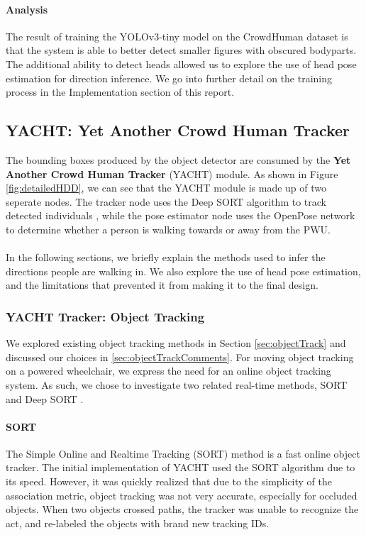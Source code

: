 \paragraph{Analysis}
The result of training the YOLOv3-tiny model on the CrowdHuman dataset is that the system is able to better detect smaller figures with obscured bodyparts. The additional ability to detect heads allowed us to explore the use of head pose estimation for direction inference. We go into further detail on the training process in the Implementation section of this report.

\subsection{YACHT: Yet Another Crowd Human Tracker}
The bounding boxes produced by the object detector are consumed by the \textbf{Yet Another Crowd Human Tracker} (YACHT) module. As shown in Figure \ref{fig:detailedHDD}, we can see that the YACHT module is made up of two seperate nodes. The tracker node uses the Deep SORT algorithm to track detected individuals \cite{Wojke2018}, while the pose estimator node uses the OpenPose \cite{Cao2017} network to determine whether a person is walking towards or away from the PWU.

\paragraph{}In the following sections, we briefly explain the  methods used to infer the directions people are walking in. We also explore the use of head pose estimation, and the limitations that prevented it from making it to the final design.

\subsubsection{YACHT Tracker: Object Tracking}
We explored existing object tracking methods in Section \ref{sec:objectTrack} and discussed our choices in \ref{sec:objectTrackComments}. For moving object tracking on a powered wheelchair, we express the need for an online object tracking system. As such, we chose to investigate two related real-time methods, SORT \cite{Bewley2016} and Deep SORT \cite{Wojke2018}.

\paragraph{SORT}  The Simple Online and Realtime Tracking (SORT) method is a fast online object tracker. The initial implementation of YACHT used the SORT algorithm due to its speed. However, it was quickly realized that due to the simplicity of the association metric, object tracking was not very accurate, especially for occluded objects. When two objects crossed paths, the tracker was unable to recognize the act, and re-labeled the objects with brand new tracking IDs.

